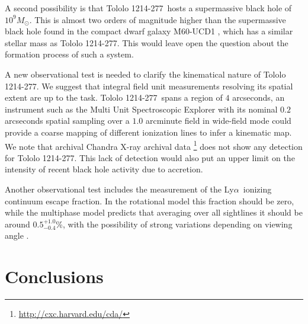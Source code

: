 \documentclass[a4,useAMS,usenatbib,usegraphicx]{mn2e}
\newcommand{\tol}{Tololo 1214-277}
\newcommand{\lya}{Ly$\alpha$}
\newcommand{\kms}{km s$^{-1}$}
\begin{document}
A second possibility is that \tol\ hosts a supermassive black hole of
$10^{9} M_{\odot}$. This is almost two orders of magnitude higher
than the supermassive black hole found in the compact dwarf galaxy
M60-UCD1 \citep{2014Natur.513..398S}, which has a similar stellar mass
as \tol. This would leave open the question about the formation
process of such a system.   


A new observational test is needed to clarify the kinematical nature of
\tol. 
We suggest that integral field unit measurements 
resolving its spatial extent are up to the task. 
\tol\ spans a region of $4$ arcseconds,
an instrument such as the Multi Unit Spectroscopic Explorer
\citep{2014Msngr.157...13B} with its
nominal $0.2$ arcseconds spatial sampling over a $1.0$ arcminute field
in wide-field mode could provide a coarse mapping of different
ionization lines to infer a kinematic map.
We note that archival Chandra X-ray archival
data \footnote{\url{http://cxc.harvard.edu/cda/}} does not show any
detection for \tol.
This lack of detection would also put an upper limit on the intensity
of recent black hole activity due to accretion. 

Another observational test includes the measurement of the
\lya\ ionizing continuum escape fraction.
In the rotational model this fraction should be zero, while
the multiphase model predicts that averaging over all sightlines
it should be around $0.5^{+1.0}_{-0.4}$\%, with the possibility of strong
variations depending on viewing angle \citep{Gronke2016}. 



\section{Conclusions}
\end{document}

